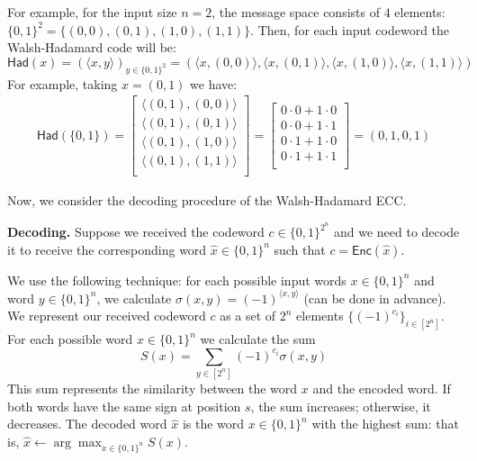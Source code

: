 \documentclass[../lecture-notes-148x210.tex]{subfiles}
\begin{document}
\begin{example}
For example, for the input size $n=2$, the message space consists of $4$
elements: $\{0,1\}^2 = \{(0, 0), (0, 1), (1, 0), (1, 1)\}$. Then, for each input codeword
the Walsh-Hadamard code will be:
\begin{equation*}
    \mathsf{Had}(x) = (\langle x, y \rangle)_{y \in \{0,1\}^2} = (\langle x, (0, 0) \rangle, \langle x, (0, 1) \rangle, \langle x, (1, 0) \rangle, \langle x,  (1, 1) \rangle)
\end{equation*}
For example, taking $x = (0, 1)$ we have:
\begin{gather*}
    \mathsf{Had}(\{0, 1\}) = \begin{bmatrix}
    \langle (0, 1), (0, 0) \rangle\\
    \langle (0, 1), (0, 1) \rangle\\
    \langle (0, 1), (1, 0) \rangle\\
    \langle (0, 1), (1, 1) \rangle\\
    \end{bmatrix}= \begin{bmatrix}
        0 \cdot 0 + 1 \cdot 0 \\
        0 \cdot 0 + 1 \cdot 1 \\
        0 \cdot 1 + 1 \cdot 0 \\
        0 \cdot 1 + 1 \cdot 1 \\
    \end{bmatrix} = (0, 1, 0, 1)
\end{gather*}
\end{example}

Now, we consider the decoding procedure of the Walsh-Hadamard ECC.

\textbf{Decoding.} Suppose we received the codeword $c \in \{0,1\}^{2^n}$ and we
need to decode it to receive the corresponding word $\hat{x} \in \{0,1\}^n$ such
that $c=\mathsf{Enc}(\hat{x})$.

We use the following technique: for each possible input words $x \in \{0,1\}^n$
and word $y \in \{0, 1\}^n$, we calculate $\sigma(x,y) = (-1)^{\langle x, y
\rangle}$ (can be done in advance). We represent our received codeword $c$ as a
set of $2^n$ elements $\{(-1)^{c_i}\}_{i \in [2^n]}$. For each possible word $x
\in \{0, 1\}^n$ we calculate the sum 
\begin{equation*}
    S(x) = \sum_{y \in [2^n]} (-1)^{c_i}\sigma(x, y)    
\end{equation*}
This sum represents the similarity between the word $x$ and the encoded word. If
both words have the same sign at position $s$, the sum increases; otherwise, it
decreases. The decoded word $\hat{x}$ is the word $x \in \{0,1\}^n$ with the
highest sum: that is, $\hat{x} \gets \arg\max_{x \in \{0,1\}^n} S(x)$.
\end{document}
